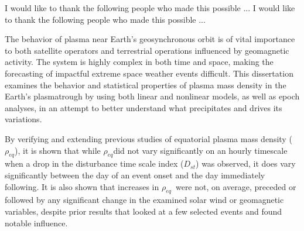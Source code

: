 \documentclass[11 pt]{GMUDissertation}
\newcommand{\req}{\ensuremath{\rho_{eq}}} %
\newcommand{\dst}{\ensuremath{D_{st}}} %
\begin{document}
\noindent I would like to thank the following people who made this possible ...
I would like to thank the following people who made this possible ...


\tableofcontents

\listoftables

\listoffigures







\abstractpage

The behavior of plasma near Earth's geosynchronous orbit is of vital importance to both satellite operators and terrestrial operations influenced by geomagnetic activity. The system is highly complex in both time and space, making the forecasting of impactful extreme space weather events difficult. This dissertation examines the behavior and statistical properties of plasma mass density in the Earth's plasmatrough by using both linear and nonlinear models, as well as epoch analyses, in an attempt to better understand what precipitates and drives its variations. 

By verifying and extending previous studies of equatorial plasma mass density (\req), it is shown that while \req did not vary significantly on an hourly timescale when a drop in the disturbance time scale index (\dst) was observed, it does vary significantly between the day of an event onset and the day immediately following. It is also shown that increases in \req\ were not, on average, preceded or followed by any significant change in the examined solar wind or geomagnetic variables, despite prior results that looked at a few selected events and found notable influence. 


\end{document}
